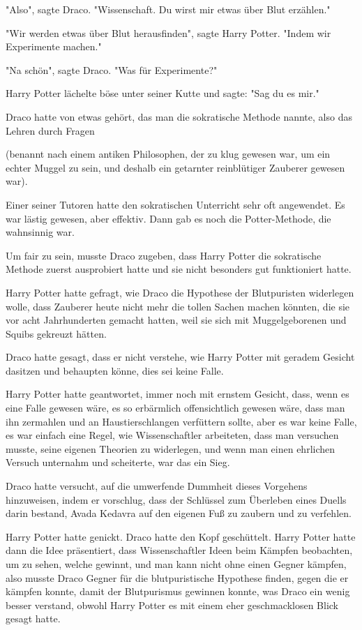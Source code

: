 {"Also", sagte Draco. "Wissenschaft. Du wirst mir etwas über Blut erzählen."

"Wir werden etwas über Blut herausfinden", sagte Harry Potter. "Indem wir Experimente machen."

"Na schön", sagte Draco. "Was für Experimente?"

Harry Potter lächelte böse unter seiner Kutte und sagte: "Sag du es mir."

Draco hatte von etwas gehört, das man die sokratische Methode nannte, also das Lehren durch Fragen

(benannt nach einem antiken Philosophen, der zu klug gewesen war, um ein echter Muggel zu sein, und deshalb ein getarnter reinblütiger Zauberer gewesen war).

Einer seiner Tutoren hatte den sokratischen Unterricht sehr oft angewendet. Es war lästig gewesen, aber effektiv. Dann gab es noch die Potter-Methode, die wahnsinnig war.

Um fair zu sein, musste Draco zugeben, dass Harry Potter die sokratische Methode zuerst ausprobiert hatte und sie nicht besonders gut funktioniert hatte.

Harry Potter hatte gefragt, wie Draco die Hypothese der Blutpuristen widerlegen wolle, dass Zauberer heute nicht mehr die tollen Sachen machen könnten, die sie vor acht Jahrhunderten gemacht hatten, weil sie sich mit Muggelgeborenen und Squibs gekreuzt hätten.

Draco hatte gesagt, dass er nicht verstehe, wie Harry Potter mit geradem Gesicht dasitzen und behaupten könne, dies sei keine Falle.

Harry Potter hatte geantwortet, immer noch mit ernstem Gesicht, dass, wenn es eine Falle gewesen wäre, es so erbärmlich offensichtlich gewesen wäre, dass man ihn zermahlen und an Haustierschlangen verfüttern sollte, aber es war keine Falle, es war einfach eine Regel, wie Wissenschaftler arbeiteten, dass man versuchen musste, seine eigenen Theorien zu widerlegen, und wenn man einen ehrlichen Versuch unternahm und scheiterte, war das ein Sieg.

Draco hatte versucht, auf die umwerfende Dummheit dieses Vorgehens hinzuweisen, indem er vorschlug, dass der Schlüssel zum Überleben eines Duells darin bestand, Avada Kedavra auf den eigenen Fuß zu zaubern und zu verfehlen.

Harry Potter hatte genickt. Draco hatte den Kopf geschüttelt. Harry Potter hatte dann die Idee präsentiert, dass Wissenschaftler Ideen beim Kämpfen beobachten, um zu sehen, welche gewinnt, und man kann nicht ohne einen Gegner kämpfen, also musste Draco Gegner für die blutpuristische Hypothese finden, gegen die er kämpfen konnte, damit der Blutpurismus gewinnen konnte, was Draco ein wenig besser verstand, obwohl Harry Potter es mit einem eher geschmacklosen Blick gesagt hatte.

}
